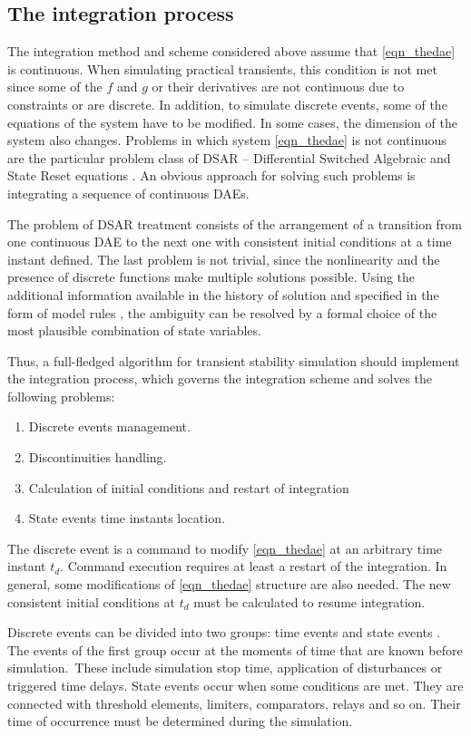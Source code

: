\documentclass[lettersize,journal]{IEEEtran}
\begin{document}
\subsection {The integration process}
The integration method and scheme considered above assume that \eqref{eqn_thedae} is continuous. When simulating practical transients, this condition is not met since some of the \(f\) and \(g\) or their derivatives are not continuous due to constraints or are discrete. In addition, to simulate discrete events, some of the equations of the system have to be modified. In some cases, the dimension of the system also changes. Problems in which system \eqref{eqn_thedae} is not continuous are the particular problem class of DSAR -- Differential Switched Algebraic and State Reset equations \cite{Hiskens01}. An obvious approach for solving such problems is integrating a sequence of continuous DAEs.

The problem of DSAR treatment consists of the arrangement of a transition from one continuous DAE to the next one with consistent initial conditions at a time instant defined. The last problem is not trivial, since the nonlinearity and the presence of discrete functions make multiple solutions possible. Using the additional information available in the history of solution and specified in the form of model rules \cite{mycompiler}, the ambiguity can be resolved by a formal choice of the most plausible combination of state variables.

Thus, a full-fledged algorithm for transient stability simulation should implement the integration process, which governs the integration scheme and solves the following problems:
\begin{enumerate}
	\item Discrete events management.
	\item Discontinuities handling.
	\item Calculation of initial conditions and restart of integration
	\item State events time instants location.
\end{enumerate}

The discrete event is a command to modify \eqref{eqn_thedae} at an arbitrary time instant \(t_d\). Command execution requires at least a restart of the integration. In general, some modifications of \eqref{eqn_thedae} structure are also needed. The new consistent initial conditions at \(t_d\) must be calculated to resume integration.

Discrete events can be divided into two groups: time events and state events \cite{cellier06}.  The events of the first group occur at the moments of time that are known before simulation. These include simulation stop time, application of disturbances or triggered time delays. State events occur when some conditions are met. They are connected with threshold elements, limiters, comparators, relays and so on.  Their time of occurrence must be determined during the simulation. 
\end{document}
